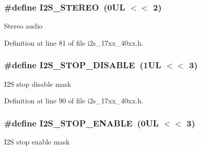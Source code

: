 \subsubsection[{\texorpdfstring{I2\+S\+\_\+\+S\+T\+E\+R\+EO}{I2S_STEREO}}]{\setlength{\rightskip}{0pt plus 5cm}\#define I2\+S\+\_\+\+S\+T\+E\+R\+EO~(0\+U\+L $<$$<$ 2)}\hypertarget{group__I2S__17XX__40XX_ga07e34ebc83183644aa54cc124b769a43}{}\label{group__I2S__17XX__40XX_ga07e34ebc83183644aa54cc124b769a43}
Stereo audio 

Definition at line 81 of file i2s\+\_\+17xx\+\_\+40xx.\+h.

\subsubsection[{\texorpdfstring{I2\+S\+\_\+\+S\+T\+O\+P\+\_\+\+D\+I\+S\+A\+B\+LE}{I2S_STOP_DISABLE}}]{\setlength{\rightskip}{0pt plus 5cm}\#define I2\+S\+\_\+\+S\+T\+O\+P\+\_\+\+D\+I\+S\+A\+B\+LE~(1\+U\+L $<$$<$ 3)}\hypertarget{group__I2S__17XX__40XX_gaf442a366f6467626a2f72fdabf9b6d89}{}\label{group__I2S__17XX__40XX_gaf442a366f6467626a2f72fdabf9b6d89}
I2S stop disable mask 

Definition at line 90 of file i2s\+\_\+17xx\+\_\+40xx.\+h.

\subsubsection[{\texorpdfstring{I2\+S\+\_\+\+S\+T\+O\+P\+\_\+\+E\+N\+A\+B\+LE}{I2S_STOP_ENABLE}}]{\setlength{\rightskip}{0pt plus 5cm}\#define I2\+S\+\_\+\+S\+T\+O\+P\+\_\+\+E\+N\+A\+B\+LE~(0\+U\+L $<$$<$ 3)}\hypertarget{group__I2S__17XX__40XX_gabe1e11f6f4ce8542408e466b3316ca3c}{}\label{group__I2S__17XX__40XX_gabe1e11f6f4ce8542408e466b3316ca3c}
I2S stop enable mask 


